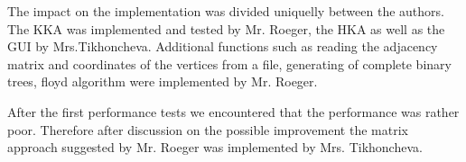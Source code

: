 \documentclass[12pt,a4paper]{article}
\begin{document}
\vspace{30pt}

The impact on the implementation was divided uniquelly between the authors. The KKA was implemented and tested by Mr. Roeger, the HKA as well as the GUI by Mrs.Tikhoncheva. Additional functions such as reading the adjacency matrix and coordinates of the vertices from a file, generating of complete binary trees, floyd algorithm were implemented by Mr. Roeger.

After the first performance tests we encountered that the performance was rather poor. Therefore after discussion on the possible improvement the matrix approach suggested by Mr. Roeger was implemented by Mrs. Tikhoncheva.





\end{document}
